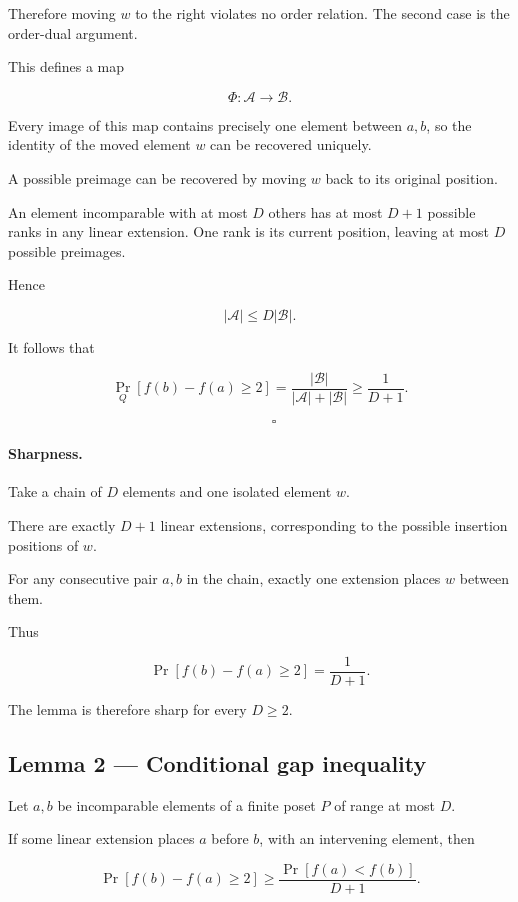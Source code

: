 \documentclass[11pt]{article}
\begin{document}
Therefore moving \(w\) to the right violates no order relation. The second case is the order-dual argument.

This defines a map

\[
\Phi:\mathcal A\longrightarrow\mathcal B.
\]

Every image of this map contains precisely one element between \(a,b\), so the identity of the moved element \(w\) can be recovered uniquely.

A possible preimage can be recovered by moving \(w\) back to its original position.

An element incomparable with at most \(D\) others has at most \(D+1\) possible ranks in any linear extension. One rank is its current position, leaving at most \(D\) possible preimages.

Hence

\[
|\mathcal A|\leq D|\mathcal B|.
\]

It follows that

\[
\Pr_Q[f(b)-f(a)\geq2]
=
\frac{|\mathcal B|}
{|\mathcal A|+|\mathcal B|}
\geq\frac1{D+1}.
\]

\[
\qquad\square
\]

\paragraph{Sharpness.}

Take a chain of \(D\) elements and one isolated element \(w\).

There are exactly \(D+1\) linear extensions, corresponding to the possible insertion positions of \(w\).

For any consecutive pair \(a,b\) in the chain, exactly one extension places \(w\) between them.

Thus

\[
\Pr[f(b)-f(a)\geq2]=\frac1{D+1}.
\]

The lemma is therefore sharp for every \(D\geq2\).

\subsection{Lemma 2 --- Conditional gap inequality}

Let \(a,b\) be incomparable elements of a finite poset \(P\) of range at most \(D\).

If some linear extension places \(a\) before \(b\), with an intervening element, then

\[
\boxed{
\Pr[f(b)-f(a)\geq2]
\geq
\frac{\Pr[f(a)<f(b)]}{D+1}.
}
\]
\end{document}
